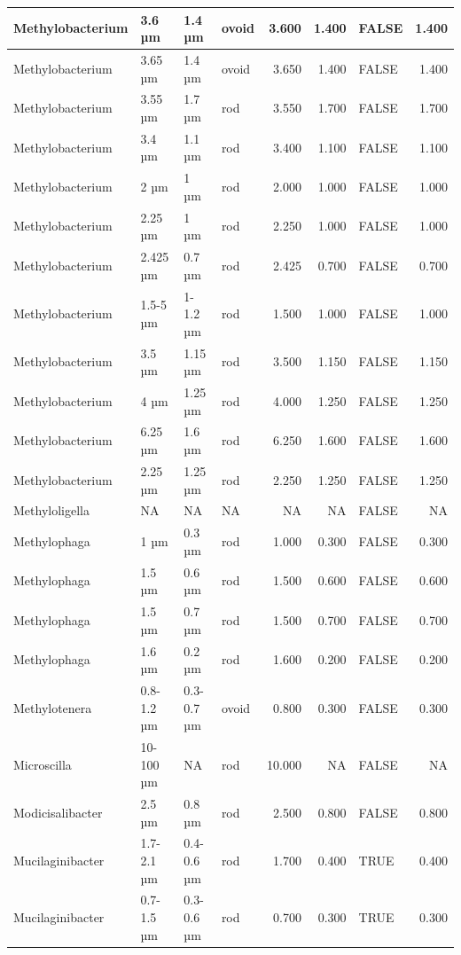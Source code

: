 \documentclass[
]{article}
\begin{document}
\begin{table}
\begin{tabular}{l|l|l|l|r|r|l|r}
\hline
Methylobacterium & 3.6 µm & 1.4 µm & ovoid & 3.600 & 1.400 & FALSE & 1.400\\
\hline
Methylobacterium & 3.65 µm & 1.4 µm & ovoid & 3.650 & 1.400 & FALSE & 1.400\\
\hline
Methylobacterium & 3.55 µm & 1.7 µm & rod & 3.550 & 1.700 & FALSE & 1.700\\
\hline
Methylobacterium & 3.4 µm & 1.1 µm & rod & 3.400 & 1.100 & FALSE & 1.100\\
\hline
Methylobacterium & 2 µm & 1 µm & rod & 2.000 & 1.000 & FALSE & 1.000\\
\hline
Methylobacterium & 2.25 µm & 1 µm & rod & 2.250 & 1.000 & FALSE & 1.000\\
\hline
Methylobacterium & 2.425 µm & 0.7 µm & rod & 2.425 & 0.700 & FALSE & 0.700\\
\hline
Methylobacterium & 1.5-5 µm & 1-1.2 µm & rod & 1.500 & 1.000 & FALSE & 1.000\\
\hline
Methylobacterium & 3.5 µm & 1.15 µm & rod & 3.500 & 1.150 & FALSE & 1.150\\
\hline
Methylobacterium & 4 µm & 1.25 µm & rod & 4.000 & 1.250 & FALSE & 1.250\\
\hline
Methylobacterium & 6.25 µm & 1.6 µm & rod & 6.250 & 1.600 & FALSE & 1.600\\
\hline
Methylobacterium & 2.25 µm & 1.25 µm & rod & 2.250 & 1.250 & FALSE & 1.250\\
\hline
Methyloligella & NA & NA & NA & NA & NA & FALSE & NA\\
\hline
Methylophaga & 1 µm & 0.3 µm & rod & 1.000 & 0.300 & FALSE & 0.300\\
\hline
Methylophaga & 1.5 µm & 0.6 µm & rod & 1.500 & 0.600 & FALSE & 0.600\\
\hline
Methylophaga & 1.5 µm & 0.7 µm & rod & 1.500 & 0.700 & FALSE & 0.700\\
\hline
Methylophaga & 1.6 µm & 0.2 µm & rod & 1.600 & 0.200 & FALSE & 0.200\\
\hline
Methylotenera & 0.8-1.2 µm & 0.3-0.7 µm & ovoid & 0.800 & 0.300 & FALSE & 0.300\\
\hline
Microscilla & 10-100 µm & NA & rod & 10.000 & NA & FALSE & NA\\
\hline
Modicisalibacter & 2.5 µm & 0.8 µm & rod & 2.500 & 0.800 & FALSE & 0.800\\
\hline
Mucilaginibacter & 1.7-2.1 µm & 0.4-0.6 µm & rod & 1.700 & 0.400 & TRUE & 0.400\\
\hline
Mucilaginibacter & 0.7-1.5 µm & 0.3-0.6 µm & rod & 0.700 & 0.300 & TRUE & 0.300\\

\end{tabular}
\end{table}
\end{document}
